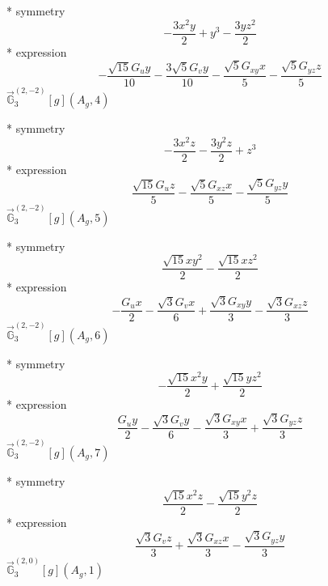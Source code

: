 \documentclass[fleqn,8pt]{jsarticle}
\begin{document}
\noindent\quad ** symmetry
\begin{dmath*}
- \frac{3 x^{2} y}{2} + y^{3} - \frac{3 y z^{2}}{2}
\end{dmath*}
\noindent\quad ** expression
\begin{dmath*}
- \frac{\sqrt{15} G_{u} y}{10} - \frac{3 \sqrt{5} G_{v} y}{10} - \frac{\sqrt{5} G_{xy} x}{5} - \frac{\sqrt{5} G_{yz} z}{5}
\end{dmath*}
\noindent\quad $\vec{\mathbb{G}}_{3}^{(2,-2)}[g](A_{g},4)$

\noindent\quad ** symmetry
\begin{dmath*}
- \frac{3 x^{2} z}{2} - \frac{3 y^{2} z}{2} + z^{3}
\end{dmath*}
\noindent\quad ** expression
\begin{dmath*}
\frac{\sqrt{15} G_{u} z}{5} - \frac{\sqrt{5} G_{xz} x}{5} - \frac{\sqrt{5} G_{yz} y}{5}
\end{dmath*}
\noindent\quad $\vec{\mathbb{G}}_{3}^{(2,-2)}[g](A_{g},5)$

\noindent\quad ** symmetry
\begin{dmath*}
\frac{\sqrt{15} x y^{2}}{2} - \frac{\sqrt{15} x z^{2}}{2}
\end{dmath*}
\noindent\quad ** expression
\begin{dmath*}
- \frac{G_{u} x}{2} - \frac{\sqrt{3} G_{v} x}{6} + \frac{\sqrt{3} G_{xy} y}{3} - \frac{\sqrt{3} G_{xz} z}{3}
\end{dmath*}
\noindent\quad $\vec{\mathbb{G}}_{3}^{(2,-2)}[g](A_{g},6)$

\noindent\quad ** symmetry
\begin{dmath*}
- \frac{\sqrt{15} x^{2} y}{2} + \frac{\sqrt{15} y z^{2}}{2}
\end{dmath*}
\noindent\quad ** expression
\begin{dmath*}
\frac{G_{u} y}{2} - \frac{\sqrt{3} G_{v} y}{6} - \frac{\sqrt{3} G_{xy} x}{3} + \frac{\sqrt{3} G_{yz} z}{3}
\end{dmath*}
\noindent\quad $\vec{\mathbb{G}}_{3}^{(2,-2)}[g](A_{g},7)$

\noindent\quad ** symmetry
\begin{dmath*}
\frac{\sqrt{15} x^{2} z}{2} - \frac{\sqrt{15} y^{2} z}{2}
\end{dmath*}
\noindent\quad ** expression
\begin{dmath*}
\frac{\sqrt{3} G_{v} z}{3} + \frac{\sqrt{3} G_{xz} x}{3} - \frac{\sqrt{3} G_{yz} y}{3}
\end{dmath*}
\noindent\quad $\vec{\mathbb{G}}_{3}^{(2,0)}[g](A_{g},1)$
\end{document}
